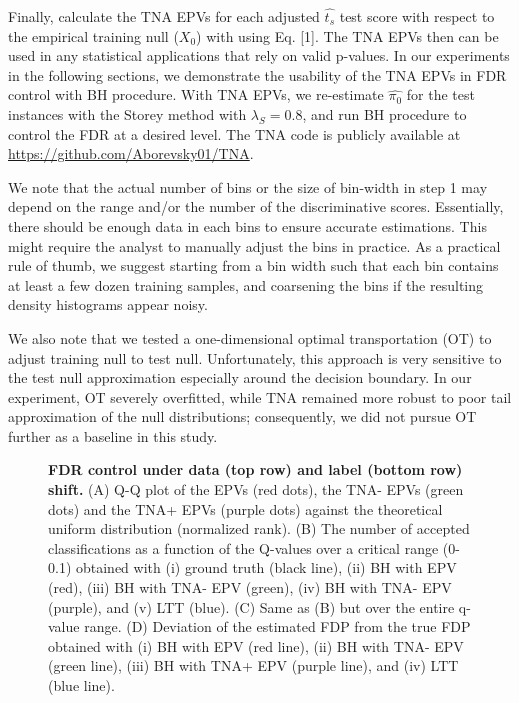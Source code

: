 \documentclass[10pt,letterpaper]{article}
\begin{document}
	Finally, calculate the TNA EPVs for each adjusted $\hat{t_s}$ test score with respect to the empirical training null ($X_0$) with using Eq. [1].
	The TNA EPVs then can be used in any statistical applications that rely on valid p-values.
	In our experiments in the following sections, we demonstrate the usability of the TNA EPVs in FDR control with BH procedure.
	With TNA EPVs, we re-estimate $\hat{\pi_0}$ for the test instances with the Storey method with $\lambda_S= 0.8$, and run BH procedure to control the FDR at a desired level. The TNA code is publicly available at \url{https://github.com/Aborevsky01/TNA}.
	
	We note that the actual number of bins or the size of bin-width in step 1 may depend on the range and/or the number of the discriminative scores.
	Essentially, there should be enough data in each bins to ensure accurate estimations.
	This might require the analyst to manually adjust the bins in practice.
	As a practical rule of thumb, we suggest starting from a bin width such that each bin contains at least a few dozen training samples, and coarsening the bins if the resulting density histograms appear noisy.
	
	We also note that we tested a one-dimensional optimal transportation (OT) to adjust training null to test null.
	Unfortunately, this approach is very sensitive to the test null approximation especially around the decision boundary.
	In our experiment, OT severely overfitted, while TNA remained more robust to poor tail approximation of the null distributions; consequently, we did not pursue OT further as a baseline in this study.
	

\begin{figure}[h!]
	\centering
\caption{{\bf  FDR control under data (top row) and label (bottom row) shift.}
	(A) Q-Q plot of the EPVs (red dots), the TNA- EPVs (green dots) and the TNA+ EPVs (purple dots) against the theoretical uniform distribution (normalized rank).
	(B) The number of accepted classifications as a function of the Q-values over a critical range (0-0.1) obtained with (i) ground truth (black line), (ii) BH with EPV (red), (iii) BH with TNA- EPV (green), (iv) BH with TNA- EPV (purple), and (v) LTT (blue).
	(C) Same as (B) but over the entire q-value range.
	(D) Deviation of the estimated FDP from the true FDP obtained with (i) BH with EPV (red line), (ii) BH with TNA- EPV  (green line),  (iii) BH with TNA+ EPV  (purple line), and (iv) LTT (blue line).}
	\label{fig:mnist_shfit}
\end{figure}
\end{document}
